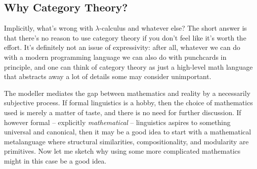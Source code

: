 \subsection{Why Category Theory?}


Implicitly, what's wrong with $\lambda$-calculus and whatever else? The short answer is that there's no reason to use category theory if you don't feel like it's worth the effort. It's definitely not an issue of expressivity: after all, whatever we can do with a modern programming language we can also do with punchcards in principle, and one can think of category theory as just a high-level math language that abstracts away a lot of details some may consider unimportant.

 The modeller mediates the gap between mathematics and reality by a necessarily subjective process. If formal linguistics is a hobby, then the choice of mathematics used is merely a matter of taste, and there is no need for further discussion. If however formal -- explicitly \emph{mathematical} -- linguistics aspires to something universal and canonical, then it may be a good idea to start with a mathematical metalanguage where structural similarities, compositionality, and modularity are primitives. Now let me sketch why using some more complicated mathematics might in this case be a good idea.\\

